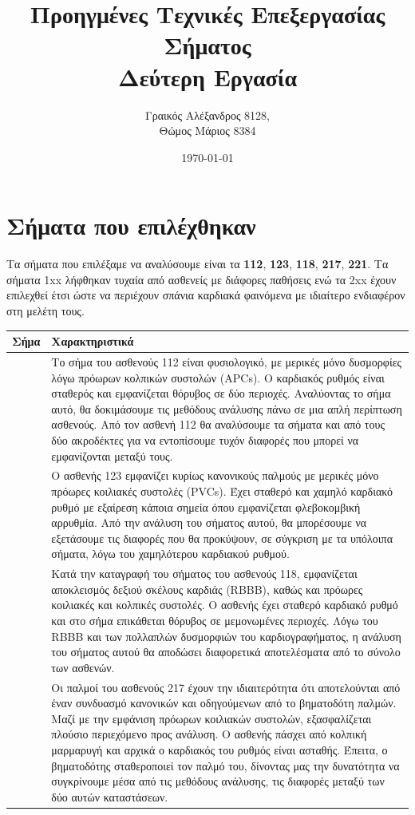 \documentclass[11pt,a4paper]{article}
\title{Προηγμένες Τεχνικές Επεξεργασίας Σήματος\\Δεύτερη Εργασία}
\author{Γραικός Αλέξανδρος 8128, \\Θώμος Μάριος 8384}
\date{\today}
\begin{document}
\maketitle

\section*{Σήματα που επιλέχθηκαν}
Τα σήματα που επιλέξαμε να αναλύσουμε είναι τα \textbf{112}, \textbf{123}, \textbf{118}, \textbf{217}, \textbf{221}. Τα σήματα 1xx λήφθηκαν τυχαία από ασθενείς με διάφορες παθήσεις ενώ τα 2xx έχουν επιλεχθεί έτσι ώστε να περιέχουν σπάνια καρδιακά φαινόμενα με ιδιαίτερο ενδιαφέρον στη μελέτη τους.

\begin{center}
\begin{tabular}{| >{\centering\arraybackslash}m{1cm} | >{\centering\arraybackslash}m{15cm}|} 
 \hline
 Σήμα & Χαρακτηριστικά \\ 
 \hline 
 112 &  Το σήμα του ασθενούς 112 είναι φυσιολογικό, με μερικές μόνο δυσμορφίες λόγω πρόωρων κολπικών συστολών (APCs). Ο καρδιακός ρυθμός είναι σταθερός και εμφανίζεται θόρυβος σε δύο περιοχές. Αναλύοντας το σήμα αυτό, θα δοκιμάσουμε τις μεθόδους ανάλυσης πάνω σε μια απλή περίπτωση ασθενούς. Από τον ασθενή 112 θα αναλύσουμε τα σήματα και από τους δύο ακροδέκτες για να εντοπίσουμε τυχόν διαφορές που μπορεί να εμφανίζονται μεταξύ τους. \\
 \hline
 123 & Ο ασθενής 123 εμφανίζει κυρίως κανονικούς παλμούς με μερικές μόνο πρόωρες κοιλιακές συστολές (PVCs). Έχει σταθερό και χαμηλό καρδιακό ρυθμό με εξαίρεση κάποια σημεία όπου εμφανίζεται φλεβοκομβική αρρυθμία. Από την ανάλυση του σήματος αυτού, θα μπορέσουμε να εξετάσουμε τις διαφορές που θα προκύψουν, σε σύγκριση με τα υπόλοιπα σήματα, λόγω του χαμηλότερου καρδιακού ρυθμού. \\
 \hline
 118 & Κατά την καταγραφή του σήματος του ασθενούς 118, εμφανίζεται αποκλεισμός δεξιού σκέλους καρδιάς (RBBB), καθώς και πρόωρες κοιλιακές και κολπικές συστολές. Ο ασθενής έχει σταθερό καρδιακό ρυθμό και στο σήμα επικάθεται θόρυβος σε μεμονωμένες περιοχές. Λόγω του RBBB και των πολλαπλών δυσμορφιών του καρδιογραφήματος, η ανάλυση του σήματος αυτού θα αποδώσει διαφορετικά αποτελέσματα από το σύνολο των ασθενών. \\
 \hline
 217 & Οι παλμοί του ασθενούς 217 έχουν την ιδιαιτερότητα ότι αποτελούνται από έναν συνδυασμό κανονικών και οδηγούμενων από το βηματοδότη παλμών. Μαζί με την εμφάνιση πρόωρων κοιλιακών συστολών, εξασφαλίζεται πλούσιο περιεχόμενο προς ανάλυση. Ο ασθενής πάσχει από κολπική μαρμαρυγή και αρχικά ο καρδιακός του ρυθμός είναι ασταθής. Έπειτα, ο βηματοδότης σταθεροποιεί τον παλμό του, δίνοντας μας την δυνατότητα να συγκρίνουμε μέσα από τις μεθόδους ανάλυσης, τις διαφορές μεταξύ των δύο αυτών καταστάσεων. \\

\end{tabular}
\end{center}
\end{document}
